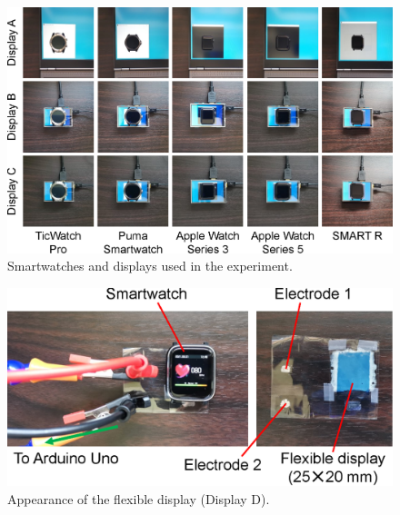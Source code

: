\documentclass[sigconf]{acmart}
\begin{document}
\begin{figure}[!t]
  \centering
  \includegraphics[width=0.78\linewidth]{figures/smartwatches.eps}
  \caption{Smartwatches and displays used in the experiment.}
  \label{fig:smartwatches}
\end{figure}

\begin{figure}[!t]
  \centering
  \includegraphics[width=0.75\linewidth]{figures/flexible.eps}
  \caption{Appearance of the flexible display (Display D).}
  \label{fig:flexible}
\end{figure}
\end{document}
